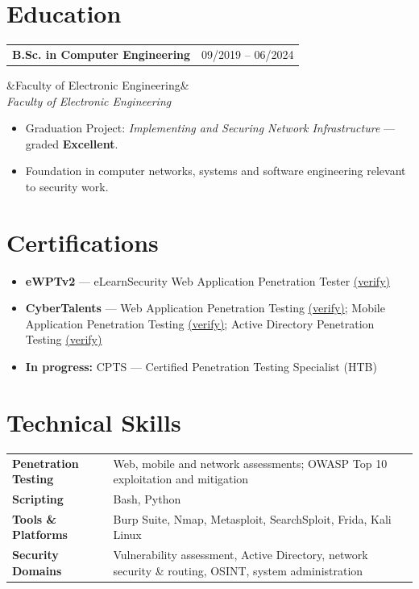 \documentclass[11pt,a4paper]{article}
\makeatletter
\newcommand{\entry}[3]{%
  \noindent\begin{tabularx}{\linewidth}{@{}X r@{}}
    \textbf{#1} & {\color{muted}#3} \\
  \end{tabularx}%
  \ifx&#2&\else\vspace{1pt}\\[-2pt]{\color{muted}\itshape #2}\fi%
  \par\vspace{3pt}
}
\newcommand{\skillrow}[2]{\textbf{#1} & #2 \\[3pt]}
\newenvironment{cvitems}
  {\begin{itemize}[leftmargin=1.3em,itemsep=2pt,topsep=3pt,parsep=0pt]}
  {\end{itemize}}
\makeatother
\begin{document}
\section{Education}
\entry{B.Sc. in Computer Engineering \normalfont{--- Menoufia University}}{Faculty of Electronic Engineering}{09/2019 -- 06/2024}
\vspace{-2pt}
\begin{cvitems}
  \item Graduation Project: \textit{Implementing and Securing Network Infrastructure} --- graded \textbf{Excellent}.
  \item Foundation in computer networks, systems and software engineering relevant to security work.
\end{cvitems}

\section{Certifications}
\begin{cvitems}
  \item \textbf{eWPTv2} --- eLearnSecurity Web Application Penetration Tester \href{https://certs.ine.com/85adc2a2-9344-4a6d-a276-5653d15267c2\#acc.fApd1TeR}{(verify)}
  \item \textbf{CyberTalents} --- Web Application Penetration Testing \href{https://cybertalents.com/certifications/4959bf05-eabf-41a3-98ad-d55bd0d35f8c}{(verify)}; Mobile Application Penetration Testing \href{https://cybertalents.com/certifications/49e097e9-173f-4a6d-bde8-f32251b2282c}{(verify)}; Active Directory Penetration Testing \href{https://cybertalents.com/certifications/e976caf4-b8a5-4b0c-a33c-896ccbd770c7}{(verify)}
  \item \textbf{In progress:} CPTS --- Certified Penetration Testing Specialist (HTB)
\end{cvitems}

\section{Technical Skills}
\begin{tabularx}{\linewidth}{@{}>{\raggedright\arraybackslash}p{4.2cm} X@{}}
\skillrow{Penetration Testing}{Web, mobile and network assessments; OWASP Top 10 exploitation and mitigation}
\skillrow{Scripting}{Bash, Python}
\skillrow{Tools \& Platforms}{Burp Suite, Nmap, Metasploit, SearchSploit, Frida, Kali Linux}
\skillrow{Security Domains}{Vulnerability assessment, Active Directory, network security \& routing, OSINT, system administration}
\end{tabularx}
\end{document}

